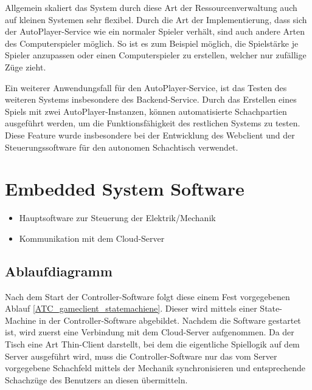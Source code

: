 Allgemein skaliert das System durch diese Art der Ressourcenverwaltung
auch auf kleinen Systemen sehr flexibel. Durch die Art der
Implementierung, dass sich der AutoPlayer-Service wie ein normaler
Spieler verhält, sind auch andere Arten des Computerspieler möglich. So
ist es zum Beispiel möglich, die Spielstärke je Spieler anzupassen oder
einen Computerspieler zu erstellen, welcher nur zufällige Züge zieht.

Ein weiterer Anwendungsfall für den AutoPlayer-Service, ist das Testen
des weiteren Systems insbesondere des Backend-Service. Durch das
Erstellen eines Spiels mit zwei AutoPlayer-Instanzen, können
automatisierte Schachpartien ausgeführt werden, um die
Funktionsfähigkeit des restlichen Systems zu testen. Diese Feature wurde
insbesondere bei der Entwicklung des Webclient und der
Steuerungssoftware für den autonomen Schachtisch verwendet.

\hypertarget{embedded-system-software}{%
\chapter{Embedded System Software}\label{embedded-system-software}}

\begin{itemize}
\tightlist
\item
  Hauptsoftware zur Steuerung der Elektrik/Mechanik
\item
  Kommunikation mit dem Cloud-Server
\end{itemize}

\hypertarget{ablaufdiagramm}{%
\section{Ablaufdiagramm}\label{ablaufdiagramm}}

Nach dem Start der Controller-Software folgt diese einem Fest
vorgegebenen Ablauf \ref{ATC_gameclient_statemachiene}. Dieser wird
mittels einer State-Machine in der Controller-Software abgebildet.
Nachdem die Software gestartet ist, wird zuerst eine Verbindung mit dem
Cloud-Server aufgenommen. Da der Tisch eine Art Thin-Client darstellt,
bei dem die eigentliche Spiellogik auf dem Server ausgeführt wird, muss
die Controller-Software nur das vom Server vorgegebene Schachfeld
mittels der Mechanik synchronisieren und entsprechende Schachzüge des
Benutzers an diesen übermitteln.


